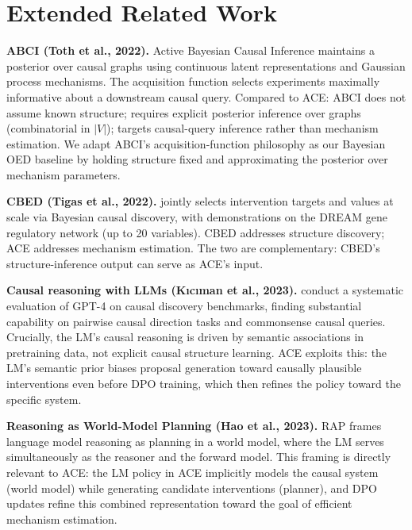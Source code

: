 \section{Extended Related Work}
\label{app:related-extended}

\textbf{ABCI (Toth et al., 2022).} Active Bayesian Causal Inference \citep{toth2022active} maintains a posterior over causal graphs using continuous latent representations and Gaussian process mechanisms. The acquisition function selects experiments maximally informative about a downstream causal query. Compared to ACE: ABCI does not assume known structure; requires explicit posterior inference over graphs (combinatorial in $|V|$); targets causal-query inference rather than mechanism estimation. We adapt ABCI's acquisition-function philosophy as our Bayesian OED baseline by holding structure fixed and approximating the posterior over mechanism parameters.

\textbf{CBED (Tigas et al., 2022).} \citep{tigas2022interventions} jointly selects intervention targets and values at scale via Bayesian causal discovery, with demonstrations on the DREAM gene regulatory network (up to 20 variables). CBED addresses structure discovery; ACE addresses mechanism estimation. The two are complementary: CBED's structure-inference output can serve as ACE's input.

\textbf{Causal reasoning with LLMs (Kıcıman et al., 2023).} \citet{kiciman2023causal} conduct a systematic evaluation of GPT-4 on causal discovery benchmarks, finding substantial capability on pairwise causal direction tasks and commonsense causal queries. Crucially, the LM's causal reasoning is driven by semantic associations in pretraining data, not explicit causal structure learning. ACE exploits this: the LM's semantic prior biases proposal generation toward causally plausible interventions even before DPO training, which then refines the policy toward the specific system.

\textbf{Reasoning as World-Model Planning (Hao et al., 2023).} RAP \citep{hao2023reasoning} frames language model reasoning as planning in a world model, where the LM serves simultaneously as the reasoner and the forward model. This framing is directly relevant to ACE: the LM policy in ACE implicitly models the causal system (world model) while generating candidate interventions (planner), and DPO updates refine this combined representation toward the goal of efficient mechanism estimation.

